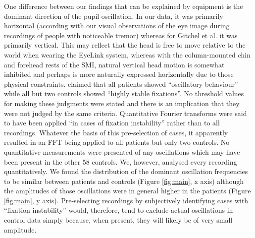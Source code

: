 \documentclass[jou,a4paper]{apa6}
\begin{document}
One difference between our findings that can be explained by equipment is the dominant direction of the pupil oscillation. In our data, it was primarily horizontal (according with our visual observations of the eye image during recordings of people with noticeable tremor) whereas for Gitchel et al. it was primarily vertical. This may reflect that the head is free to move relative to the world when wearing the EyeLink system, whereas with the column-mounted chin and forehead rests of the SMI, natural vertical head motion is somewhat inhibited and perhaps is more naturally expressed horizontally due to those physical constraints.
\citet{Gitchel2012Pervasive-ocula} claimed that all patients showed ``oscillatory behaviour'' while all but two controls showed ``highly stable fixations''. No threshold values for making these judgments were stated and there is an implication that they were not judged by the same criteria. Quantitative Fourier transforms were said to have been applied ``in cases of fixation instability'' rather than to all recordings. Whatever the basis of this pre-selection of cases, it apparently resulted in an FFT being applied to all patients but only two controls. No quantitative measurements were presented of any oscillations which may have been present in the other 58 controls. We, however, analysed every recording quantitatively. We found the distribution of the dominant oscillation frequencies to be similar between patients and controls (Figure \ref{fig:main}, x axis) although the amplitudes of those oscillations were in general higher in the patients (Figure \ref{fig:main}, y axis). Pre-selecting recordings by subjectively identifying cases with ``fixation instability'' would, therefore, tend to exclude actual oscillations in control data simply because, when present, they will likely be of very small amplitude.
\end{document}
